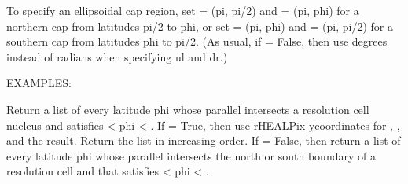 \documentclass[a4paper,12ptopenany,oneside,english]{sphinxmanual}
\begin{document}
\begin{fulllineitems}
\begin{fulllineitems}
\sphinxAtStartPar
To specify an ellipsoidal cap region, set  = (\sphinxhyphen{}pi, pi/2) and
 = (\sphinxhyphen{}pi, phi) for a northern cap from latitudes pi/2 to phi, or
set  = (\sphinxhyphen{}pi, phi) and  = (\sphinxhyphen{}pi, \sphinxhyphen{}pi/2) for a southern cap from
latitudes phi to \sphinxhyphen{}pi/2.
(As usual, if  = False,
then use degrees instead of radians when specifying ul and dr.)

\sphinxAtStartPar
EXAMPLES:

\begin{sphinxVerbatim}[commandchars=\\\{\}]
  
   
     
   
\end{sphinxVerbatim}

\end{fulllineitems}


\begin{fulllineitems}
\label{\detokenize{dggs:rhealpixdggs.dggs.RHEALPixDGGS.cell_latitudes}}
\pysigstartsignatures
{}
\pysigstopsignatures
\sphinxAtStartPar
Return a list of every latitude phi whose parallel intersects
a resolution  cell nucleus and satisfies
 \textless{} phi \textless{} .
If  = True, then use rHEALPix y\sphinxhyphen{}coordinates for ,
, and the result. Return the list in increasing order.
If  = False, then return a list of every latitude phi whose
parallel intersects the north or south boundary of a resolution
 cell and that satisfies  \textless{} phi \textless{} .


\end{fulllineitems}
\end{fulllineitems}
\end{document}
